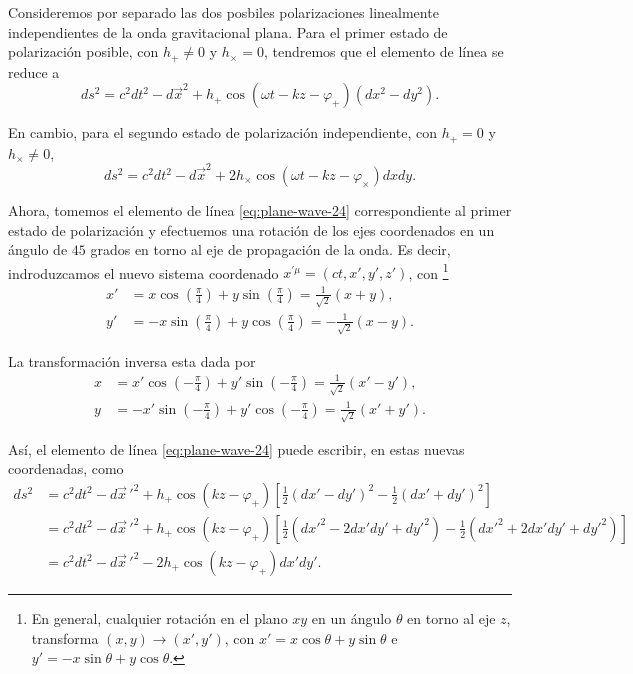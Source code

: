 \documentclass[letterpaper,11pt]{article}
\begin{document}
Consideremos por separado las dos posbiles polarizaciones linealmente independientes de la onda gravitacional plana. Para el primer estado de polarización posible, con $h_{+} \neq 0$ y $h_{\times} = 0$, tendremos que el elemento de línea se reduce a
\begin{equation}
ds^2 = c^2dt^2 - d\vec{x}^2 + h_{+}\cos(\omega t - kz - \varphi_{+})(dx^2 - dy^2). \label{eq:plane-wave-24}
\end{equation}

En cambio, para el segundo estado de polarización independiente, con $h_{+} = 0$ y $h_{\times} \neq 0$,
\begin{equation}
ds^2 = c^2dt^2 - d\vec{x}^2 + 2h_{\times} \cos(\omega t - kz - \varphi_{\times}) dxdy. \label{eq:plane-wave-25}
\end{equation}

Ahora, tomemos el elemento de línea \eqref{eq:plane-wave-24} correspondiente al primer estado de polarización y efectuemos una rotación de los ejes coordenados en un ángulo de $45$ grados en torno al eje de propagación de la onda. Es decir, indroduzcamos el nuevo sistema coordenado $x^{'\mu} = (ct,x',y',z')$, con \footnote{En general, cualquier rotación en el plano $xy$ en un ángulo $\theta$ en torno al eje $z$, transforma $(x,y) \rightarrow (x',y')$, con $x' = x \cos \theta + y \sin\theta$ e $y' = - x \sin\theta + y \cos \theta$.}
\begin{align}
x' &=  x \cos\left(\frac{\pi}{4}\right) + y \sin\left(\frac{\pi}{4}\right) = \frac{1}{\sqrt{2}}(x + y), \\
y' &= - x \sin\left(\frac{\pi}{4}\right) + y \cos \left(\frac{\pi}{4}\right) = -\frac{1}{\sqrt{2}}(x- y).
\end{align}

La transformación inversa esta dada por
\begin{align}
x &=  x' \cos\left(-\frac{\pi}{4}\right) + y' \sin\left(-\frac{\pi}{4}\right) = \frac{1}{\sqrt{2}}(x' - y'), \\
y &= - x' \sin\left(-\frac{\pi}{4}\right) + y' \cos \left(-\frac{\pi}{4}\right) = \frac{1}{\sqrt{2}}(x' + y').
\end{align}

Así, el elemento de línea \eqref{eq:plane-wave-24} puede escribir, en estas nuevas coordenadas, como
\begin{align}
ds^2 &= c^2 dt^2 - d\vec{x}\,'^2 + h_{+} \cos(kz - \varphi_{+})\left[\frac{1}{2}(dx' - dy')^2 - \frac{1}{2} (dx' + dy')^2\right] \nonumber \\
&= c^2 dt^2 - d\vec{x}\,'^2 + h_{+} \cos(kz - \varphi_{+})\left[\frac{1}{2}(dx'^2 - 2 dx'dy' + dy'^2) - \frac{1}{2} (dx'^2 + 2dx'dy' + dy'^2)\right] \nonumber \\
&= c^2 dt^2 - d\vec{x}\,'^2 - 2 h_{+} \cos(kz - \varphi_{+})dx'dy'.
\end{align}
\end{document}
